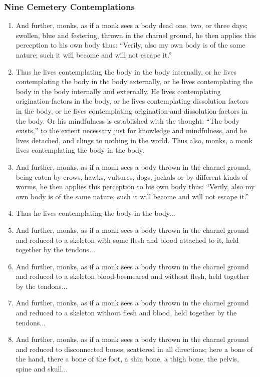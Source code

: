 \documentclass[a4 paper, 12pt]{article}
\begin{document}
\subsubsection*{Nine Cemetery Contemplations}
\begin{enumerate}[resume]
\item And further, monks, as if a monk sees a body dead one, two, or three days; swollen, blue and festering, thrown in the charnel ground, he then applies this perception to his own body thus: “Verily, also my own body is of the same nature; such it will become and will not escape it.”
\item Thus he lives contemplating the body in the body internally, or he lives contemplating the body in the body externally, or he lives contemplating the body in the body internally and externally. He lives contemplating origination-factors in the body, or he lives contemplating dissolution factors in the body, or he lives contemplating origination-and-dissolution-factors in the body. Or his mindfulness is established with the thought: “The body exists,” to the extent necessary just for knowledge and mindfulness, and he lives detached, and clings to nothing in the world. Thus also, monks, a monk lives contemplating the body in the body.
\item And further, monks, as if a monk sees a body thrown in the charnel ground, being eaten by crows, hawks, vultures, dogs, jackals or by different kinds of worms, he then applies this perception to his own body thus: “Verily, also my own body is of the same nature; such it will become and will not escape it.”
\item Thus he lives contemplating the body in the body...
\item And further, monks, as if a monk sees a body thrown in the charnel ground and reduced to a skeleton with some flesh and blood attached to it, held together by the tendons...
\item And further, monks, as if a monk sees a body thrown in the charnel ground and reduced to a skeleton blood-besmeared and without flesh, held together by the tendons...
\item And further, monks, as if a monk sees a body thrown in the charnel ground and reduced to a skeleton without flesh and blood, held together by the tendons...
\item And further, monks, as if a monk sees a body thrown in the charnel ground and reduced to disconnected bones, scattered in all directions; here a bone of the hand, there a bone of the foot, a shin bone, a thigh bone, the pelvis, spine and skull...

\end{enumerate}
\end{document}
